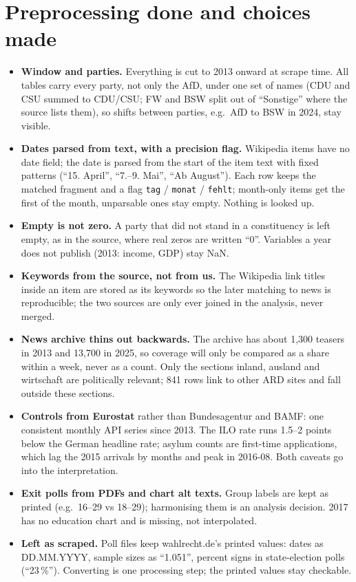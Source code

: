 \documentclass[10pt,a4paper]{article}
\newcommand{\code}[1]{\texttt{\small #1}}
\begin{document}
\section*{Preprocessing done and choices made}
\begin{itemize}
  \item \textbf{Window and parties.} Everything is cut to 2013 onward at scrape time. All tables carry every party, not only
  the AfD, under one set of names (CDU and CSU summed to CDU/CSU; FW and BSW split out of ``Sonstige'' where the source
  lists them), so shifts between parties, e.g.\ AfD to BSW in 2024, stay visible.
  \item \textbf{Dates parsed from text, with a precision flag.} Wikipedia items have no date field; the date is parsed from
  the start of the item text with fixed patterns (``15. April'', ``7.--9. Mai'', ``Ab August''). Each row keeps the matched
  fragment and a flag \code{tag} / \code{monat} / \code{fehlt}; month-only items get the first of the month, unparsable ones
  stay empty. Nothing is looked up.
  \item \textbf{Empty is not zero.} A party that did not stand in a constituency is left empty, as in the source, where real
  zeros are written ``0''. Variables a year does not publish (2013: income, GDP) stay NaN.
  \item \textbf{Keywords from the source, not from us.} The Wikipedia link titles inside an item are stored as its keywords
  so the later matching to news is reproducible; the two sources are only ever joined in the analysis, never merged.
  \item \textbf{News archive thins out backwards.} The archive has about 1{,}300 teasers in 2013 and 13{,}700 in 2025, so coverage
  will only be compared as a share within a week, never as a count. Only the sections inland, ausland and wirtschaft are
  politically relevant; 841 rows link to other ARD sites and fall outside these sections.
  \item \textbf{Controls from Eurostat} rather than Bundesagentur and BAMF: one consistent monthly API series since 2013.
  The ILO rate runs 1.5--2 points below the German headline rate; asylum counts are first-time applications, which lag the
  2015 arrivals by months and peak in 2016-08. Both caveats go into the interpretation.
  \item \textbf{Exit polls from PDFs and chart alt texts.} Group labels are kept as printed (e.g.\ 16--29 vs 18--29);
  harmonising them is an analysis decision. 2017 has no education chart and is missing, not interpolated.
  \item \textbf{Left as scraped.} Poll files keep wahlrecht.de's printed values: dates as DD.MM.YYYY, sample sizes as ``1.051'', percent signs in state-election polls (``23\,\%''). Converting is one processing step; the printed values stay checkable.
\end{itemize}
\end{document}
